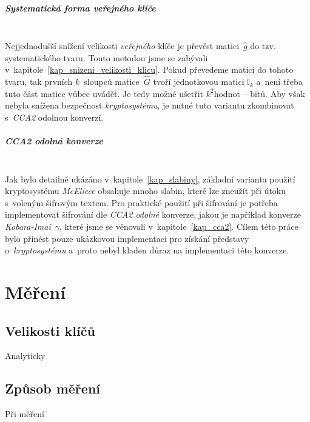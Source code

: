 \documentclass[thesis=M,czech,hidelinks]{FITthesis}[2012/06/26]
\newcommand{\0}{{\textcolor[gray]{0.75}{0}}}
\begin{document}
\paragraph{Systematická forma veřejného klíče} \hfil \\
Nejjednodušší snížení velikosti \emph{veřejného} klíče je převést
matici~$\hat{g}$ do tzv. systematického tvaru. Touto metodou jsme se zabývali
v~kapitole~\ref{kap_snizeni_velikosti_klicu}. Pokud převedeme matici do tohoto
tvaru, tak prvních $k$~sloupců matice~$\hat{G}$ tvoří jednotkovou matici
$\mathbb{I}_k$ a~není třeba tuto část matice vůbec uvádět. Je tedy možné ušetřit
$k^2$\;hodnot -- bitů. Aby však nebyla snížena bezpečnost \emph{kryptosystému},
je nutné tuto variantu zkombinovat s~\emph{CCA2} odolnou konverzí.


\paragraph{CCA2 odolná konverze} \hfil \\
Jak bylo detailně ukázáno v~kapitole~\ref{kap_slabiny}, základní varianta
použití kryptosystému \emph{McEliece} obsahuje mnoho slabin, které lze zneužít
při útoku s~voleným šifrovým textem. Pro praktické použití při šifrování je
potřeba implementovat šifrování dle \emph{CCA2 odolné} konverze, jakou je
například konverze \emph{Kobara-Imai}~$\gamma$, které jsme se věnovali
v~kapitole~\ref{kap_cca2}. Cílem této práce bylo přinést pouze ukázkovou
implementaci pro získání představy o~\emph{kryptosystému} a~proto nebyl kladen
důraz na implementaci této konverze.



\chapter{Měření}\label{kap_mereni}



\section{Velikosti klíčů}
Analyticky


\section{Způsob měření}
Při měření
\end{document}
